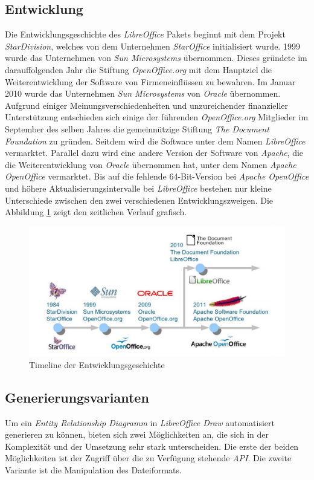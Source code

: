 \subsection{Entwicklung}
\hon{}
Die Entwicklungsgeschichte des \textit{LibreOffice} Pakets beginnt mit dem Projekt \textit{StarDivision}, welches von dem Unternehmen \textit{StarOffice} initialisiert wurde. 1999 wurde das Unternehmen von \textit{Sun Microsystems} übernommen. Dieses gründete im darauffolgenden Jahr die Stiftung \textit{OpenOffice.org} mit dem Hauptziel die Weiterentwicklung der Software von Firmeneinflüssen zu bewahren. Im Januar 2010 wurde das Unternehmen \textit{Sun Microsystems} von \textit{Oracle} übernommen. Aufgrund einiger Meinungsverschiedenheiten und unzureichender finanzieller Unterstützung entschieden sich einige der führenden \textit{OpenOffice.org} Mitglieder im September des selben Jahres die gemeinnützige Stiftung \textit{The Document Foundation} zu gründen. Seitdem wird die Software unter dem Namen \textit{LibreOffice} vermarktet. Parallel dazu wird eine andere Version der Software von \textit{Apache}, die die Weiterentwicklung von \textit{Oracle} übernommen hat, unter dem Namen \textit{Apache OpenOffice} vermarktet. Bis auf die fehlende 64-Bit-Version bei \textit{Apache OpenOffice} und höhere Aktualisierungsintervalle bei \textit{LibreOffice} bestehen nur kleine Unterschiede zwischen den zwei verschiedenen Entwicklungszweigen.
Die Abbildung \ref{timeline}  zeigt den zeitlichen Verlauf grafisch.
\noindent
\begin{figure}
	\centering
	\includegraphics[width=13cm]{images/timeline.png}
	\caption{Timeline der Entwicklungsgeschichte}
	\label{timeline}
	
\end{figure}

\subsection{Generierungsvarianten}
\hon{}
Um ein \textit{Entity Relationship Diagramm} in \textit{LibreOffice Draw} automatisiert generieren zu können, bieten sich zwei Möglichkeiten an, die sich in der Komplexität und der Umsetzung sehr stark unterscheiden. Die erste der beiden Möglichkeiten ist der Zugriff über die zu Verfügung stehende \textit{API}. Die zweite Variante ist die Manipulation des Dateiformats.

